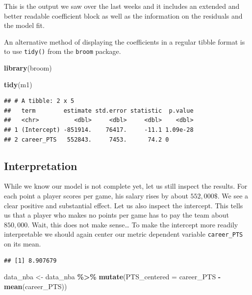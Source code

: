 \documentclass[
]{book}
\newenvironment{Shaded}{\begin{snugshade}}{\end{snugshade}}
\newcommand{\AttributeTok}[1]{\textcolor[rgb]{0.13,0.29,0.53}{#1}}
\newcommand{\FunctionTok}[1]{\textcolor[rgb]{0.13,0.29,0.53}{\textbf{#1}}}
\newcommand{\NormalTok}[1]{#1}
\newcommand{\OtherTok}[1]{\textcolor[rgb]{0.56,0.35,0.01}{#1}}
\newcommand{\SpecialCharTok}[1]{\textcolor[rgb]{0.81,0.36,0.00}{\textbf{#1}}}
\begin{document}
This is the output we saw over the last weeks and it includes an extended and
better readable coefficient block as well as the information on the residuals
and the model fit.

An alternative method of displaying the coefficients in a regular tibble format
is to use \texttt{tidy()} from the \texttt{broom} package.

\begin{Shaded}
\begin{Highlighting}[]
\FunctionTok{library}\NormalTok{(broom)}

\FunctionTok{tidy}\NormalTok{(m1)}
\end{Highlighting}
\end{Shaded}

\begin{verbatim}
## # A tibble: 2 x 5
##   term        estimate std.error statistic  p.value
##   <chr>          <dbl>     <dbl>     <dbl>    <dbl>
## 1 (Intercept) -851914.    76417.     -11.1 1.09e-28
## 2 career_PTS   552843.     7453.      74.2 0
\end{verbatim}

\hypertarget{interpretation}{%
\subsection{Interpretation}\label{interpretation}}

While we know our model is not complete yet, let us still inspect the results.
For each point a player scores per game, his salary rises by about \(552,000\$\).
We see a clear positive and substantial effect. Let us also inspect the
intercept. This tells us that a player who makes no points per game has to pay
the team about \(850,000\). Wait, this does not make sense\ldots{}
To make the intercept more readily interpretable we should again center our
metric dependent variable \texttt{career\_PTS} on its mean.

\begin{Shaded}
\end{Shaded}

\begin{verbatim}
## [1] 8.907679
\end{verbatim}

\begin{Shaded}
\begin{Highlighting}[]
\NormalTok{data\_nba }\OtherTok{\textless{}{-}}\NormalTok{ data\_nba }\SpecialCharTok{\%\textgreater{}\%} 
  \FunctionTok{mutate}\NormalTok{(}\AttributeTok{PTS\_centered =}\NormalTok{ career\_PTS }\SpecialCharTok{{-}} \FunctionTok{mean}\NormalTok{(career\_PTS))}
\end{Highlighting}
\end{Shaded}
\end{document}
